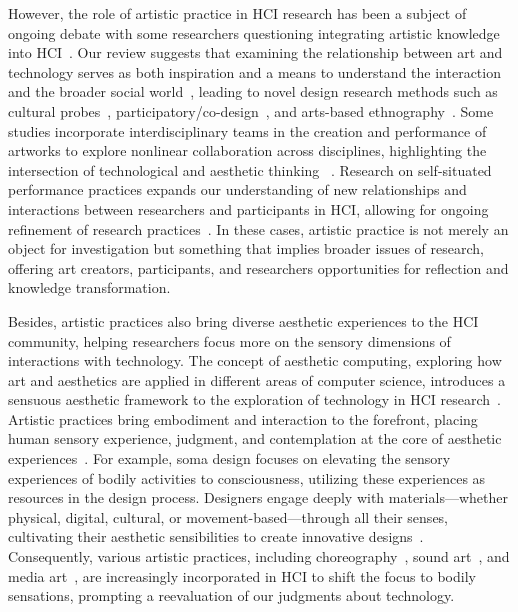 However, the role of artistic practice in HCI research has been a subject of ongoing debate with some researchers questioning integrating artistic knowledge into HCI~\cite{frankjaer2020knowledge, candy2011research}. Our review suggests that examining the relationship between art and technology serves as both inspiration and a means to understand the interaction and the broader social world~\cite{taylor2017performing}, leading to novel design research methods such as cultural probes~\cite{gorichanaz2020public,gaver1999probe}, participatory/co-design~\cite{clark2016situated, disalvo2007mapover,soden2020disaster}, and arts-based ethnography~\cite{kang2022electronicists}. Some studies incorporate interdisciplinary teams in the creation and performance of artworks to explore nonlinear collaboration across disciplines, highlighting the intersection of technological and aesthetic thinking
~\cite{kang2022electronicists,kang2018intermodulation}. Research on self-situated performance practices expands our understanding of new relationships and interactions between researchers and participants in HCI, allowing for ongoing refinement of research practices~\cite{taylor2017performing}. In these cases, artistic practice is not merely an object for investigation but something that implies broader issues of research, offering art creators, participants, and researchers opportunities for reflection and knowledge transformation.

Besides, artistic practices also bring diverse aesthetic experiences to the HCI community, helping researchers focus more on the sensory dimensions of interactions with technology. The concept of aesthetic computing, exploring how art and aesthetics are applied in different areas of computer science, introduces a sensuous aesthetic framework to the exploration of technology in HCI research~\cite{fishwick2006aesthetic, jeon2017robotic}. Artistic practices bring embodiment and interaction to the forefront, placing human sensory experience, judgment, and contemplation at the core of aesthetic experiences~\cite{taylor2017performing}. For example, soma design focuses on elevating the sensory experiences of bodily activities to consciousness, utilizing these experiences as resources in the design process. Designers engage deeply with materials—whether physical, digital, cultural, or movement-based—through all their senses, cultivating their aesthetic sensibilities to create innovative designs~\cite{hook2018designing, hook2016soma, luft2023boards}. Consequently, various artistic practices, including choreography~\cite{allen2022choreo,eriksson2019drone}, sound art~\cite{kilic2023corsetto}, and media art~\cite{branch2021tele}, are increasingly incorporated in HCI to shift the focus to bodily sensations, prompting a reevaluation of our judgments about technology.

